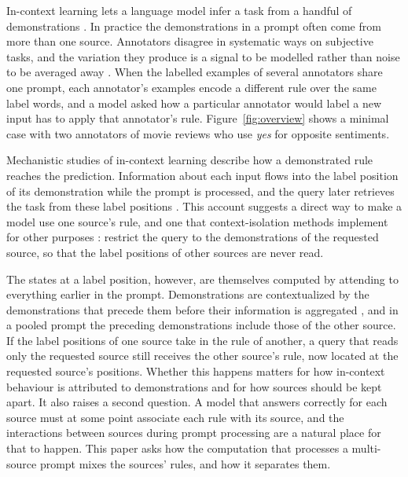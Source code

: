 \documentclass[11pt]{article}
\newcommand{\lw}[1]{\textit{#1}}
\begin{document}
In-context learning lets a language model infer a task from a handful of demonstrations \citep{brown2020language}.
In practice the demonstrations in a prompt often come from more than one source.
Annotators disagree in systematic ways on subjective tasks, and the variation they produce is a signal to be modelled rather than noise to be averaged away \citep{plank-2022-problem,davani-etal-2022-dealing,sachdeva-etal-2022-measuring}.
When the labelled examples of several annotators share one prompt, each annotator's examples encode a different rule over the same label words, and a model asked how a particular annotator would label a new input has to apply that annotator's rule.
Figure~\ref{fig:overview} shows a minimal case with two annotators of movie reviews who use \lw{yes} for opposite sentiments.

Mechanistic studies of in-context learning describe how a demonstrated rule reaches the prediction.
Information about each input flows into the label position of its demonstration while the prompt is processed, and the query later retrieves the task from these label positions \citep{wang-etal-2023-label,cho2025revisitingincontextlearninginference}.
This account suggests a direct way to make a model use one source's rule, and one that context-isolation methods implement for other purposes \citep{ratner-etal-2023-parallel}: restrict the query to the demonstrations of the requested source, so that the label positions of other sources are never read.

The states at a label position, however, are themselves computed by attending to everything earlier in the prompt.
Demonstrations are contextualized by the demonstrations that precede them before their information is aggregated \citep{bakalova2025contextualizethenaggregatecircuitsincontextlearning}, and in a pooled prompt the preceding demonstrations include those of the other source.
If the label positions of one source take in the rule of another, a query that reads only the requested source still receives the other source's rule, now located at the requested source's positions.
Whether this happens matters for how in-context behaviour is attributed to demonstrations and for how sources should be kept apart.
It also raises a second question.
A model that answers correctly for each source must at some point associate each rule with its source, and the interactions between sources during prompt processing are a natural place for that to happen.
This paper asks how the computation that processes a multi-source prompt mixes the sources' rules, and how it separates them.
\end{document}
